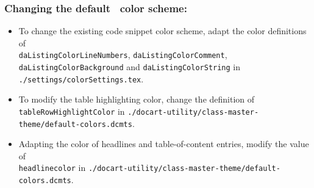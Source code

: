 		\subsubsection{Changing the default \productName~color scheme:}
			\begin{itemize}
				\item To change the existing code snippet color scheme, adapt the color definitions of\\ 
				\lstinline$daListingColorLineNumbers$, \lstinline$daListingColorComment$, \lstinline$daListingColorBackground$ and \lstinline$daListingColorString$ in\\ \lstinline$./settings/colorSettings.tex$.
				\item To modify the table highlighting color, change the definition of \lstinline$tableRowHighlightColor$ in \lstinline$./docart-utility/class-master-theme/default-colors.dcmts$.
				\item Adapting the color of headlines and table-of-content entries, modify the value of\\ 
				\lstinline$headlinecolor$ in \lstinline$./docart-utility/class-master-theme/default-colors.dcmts$.
			\end{itemize}
		